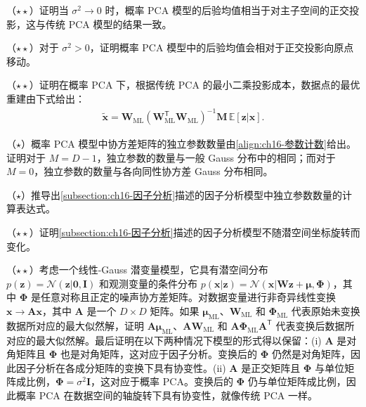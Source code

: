 \documentclass[../../main.tex]{subfiles}
\begin{document}
\begin{exercise}\label{exercise:ch16-11}
（$\star\star$）证明当 $\sigma^2\rightarrow0$ 时，概率 PCA 模型的后验均值相当于对主子空间的正交投影，这与传统 PCA 模型的结果一致。
\end{exercise}

\begin{exercise}\label{exercise:ch16-12}
（$\star\star$）对于 $\sigma^2>0$，证明概率 PCA 模型中的后验均值会相对于正交投影向原点移动。
\end{exercise}

\begin{exercise}\label{exercise:ch16-13}
（$\star\star$）证明在概率 PCA 下，根据传统 PCA 的最小二乘投影成本，数据点的最优重建由下式给出：
\begin{align}
  \tilde{\bm{x}}=\bm{W}_{\text{ML}}\left(\bm{W}_{\text{ML}}^{\mathsf T}\bm{W}_{\text{ML}}\right)^{-1}\bm{M}\,\mathbb{E}[\bm{z}|\bm{x}] .
  \label{align:ch16-习题16.13重建}
\end{align}
\end{exercise}

\begin{exercise}\label{exercise:ch16-14}
（$\star$）概率 PCA 模型中协方差矩阵的独立参数数量由\eqref{align:ch16-参数计数}给出。证明对于 $M=D-1$，独立参数的数量与一般 Gauss 分布中的相同；而对于 $M=0$，独立参数的数量与各向同性协方差 Gauss 分布相同。
\end{exercise}

\begin{exercise}\label{exercise:ch16-15}
（$\star$）推导出\cref{subsection:ch16-因子分析}描述的因子分析模型中独立参数数量的计算表达式。
\end{exercise}

\begin{exercise}\label{exercise:ch16-16}
（$\star\star$）证明\cref{subsection:ch16-因子分析}描述的因子分析模型不随潜空间坐标旋转而变化。
\end{exercise}

\begin{exercise}\label{exercise:ch16-17}
（$\star\star$）考虑一个线性-Gauss 潜变量模型，它具有潜空间分布 $p(\bm{z})=\mathcal{N}(\bm{z}|\bm{0},\bm{I})$ 和观测变量的条件分布 $p(\bm{x}|\bm{z})=\mathcal{N}(\bm{x}|\bm{W}\bm{z}+\bm{\mu},\bm{\Phi})$，其中 $\bm{\Phi}$ 是任意对称且正定的噪声协方差矩阵。对数据变量进行非奇异线性变换 $\bm{x}\rightarrow\bm{A}\bm{x}$，其中 $\bm{A}$ 是一个 $D\times D$ 矩阵。如果 $\bm{\mu}_{\text{ML}}$、$\bm{W}_{\text{ML}}$ 和 $\bm{\Phi}_{\text{ML}}$ 代表原始未变换数据所对应的最大似然解，证明 $\bm{A}\bm{\mu}_{\text{ML}}$、$\bm{A}\bm{W}_{\text{ML}}$ 和 $\bm{A}\bm{\Phi}_{\text{ML}}\bm{A}^{\mathsf T}$ 代表变换后数据所对应的最大似然解。最后证明在以下两种情况下模型的形式得以保留：(i) $\bm{A}$ 是对角矩阵且 $\bm{\Phi}$ 也是对角矩阵，这对应于因子分析。变换后的 $\bm{\Phi}$ 仍然是对角矩阵，因此因子分析在各成分矩阵的变换下具有协变性。(ii) $\bm{A}$ 是正交矩阵且 $\bm{\Phi}$ 与单位矩阵成比例，$\bm{\Phi}=\sigma^2\bm{I}$，这对应于概率 PCA。变换后的 $\bm{\Phi}$ 仍与单位矩阵成比例，因此概率 PCA 在数据空间的轴旋转下具有协变性，就像传统 PCA 一样。
\end{exercise}
\end{document}
